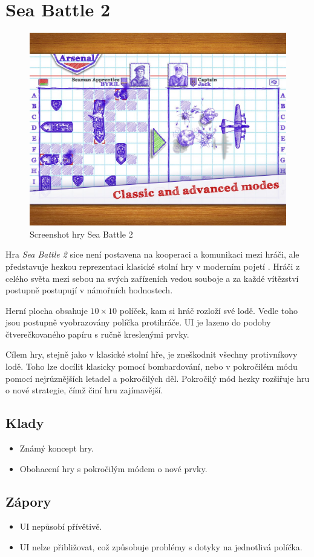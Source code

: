 \section{Sea Battle 2}

\begin{figure}
    \centering
    \includegraphics[width=0.5\linewidth]{assets/competitive-apps/sea-battle.jpg}
    \caption{Screenshot hry Sea Battle 2~\cite{byril_sea_battle_2}}
    \label{fig:sea-battle}
\end{figure}

Hra \emph{Sea Battle 2} sice není postavena na kooperaci a komunikaci mezi
hráči,
ale představuje hezkou reprezentaci klasické stolní hry v moderním pojetí
\cite{byril_sea_battle_2}.
Hráči z celého světa mezi sebou na svých zařízeních vedou souboje
a za každé vítězství postupně postupují v námořních hodnostech.

Herní plocha obsahuje $10 \times 10$ políček,
kam si hráč rozloží své lodě.
Vedle toho jsou postupně vyobrazovány políčka protihráče.
UI je lazeno do podoby čtverečkovaného papíru s ručně kreslenými prvky.

Cílem hry, stejně jako v klasické stolní hře,
je zneškodnit všechny protivníkovy lodě.
Toho lze docílit klasicky pomocí bombardování,
nebo v pokročilém módu pomocí nejrůznějších letadel a pokročilých děl.
Pokročilý mód hezky rozšiřuje hru o nové strategie,
čímž činí hru zajímavější.

\subsection*{Klady}

\begin{itemize}
    \item Známý koncept hry.
    \item Obohacení hry s pokročilým módem o nové prvky.
\end{itemize}

\subsection*{Zápory}

\begin{itemize}
    \item UI nepůsobí přívětivě.
    \item UI nelze přibližovat,
    což způsobuje problémy s dotyky na jednotlivá políčka.
\end{itemize}
